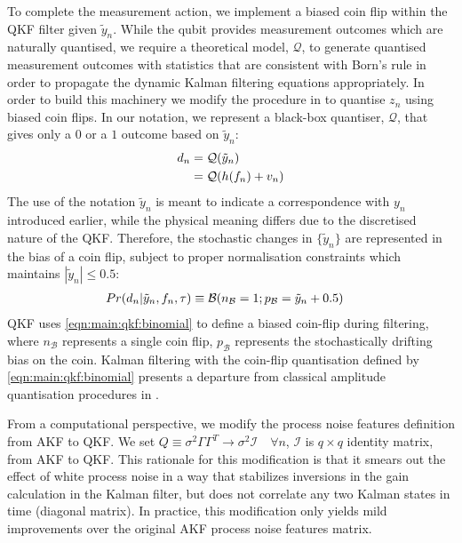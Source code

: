 To complete the measurement action, we implement a biased coin flip within the QKF filter given $\tilde{y}_n$.  While the qubit provides measurement outcomes which are naturally quantised, we require a theoretical model, $\mathcal{Q}$, to generate quantised measurement outcomes with statistics that are consistent with Born's rule in order to propagate the dynamic Kalman filtering equations appropriately. In order to build this machinery we modify the procedure in \cite{karlsson2005} to quantise $z_n$ using biased coin flips. In our notation, we represent a black-box quantiser, $\mathcal{Q}$, that gives only a $0$ or a $1$ outcome based on $\tilde{y}_n$:
\begin{align}
d_n &= \mathcal{Q}(\tilde{y}_n)\\
&=  \mathcal{Q}(h(f_n) + v_n)
\end{align}
The use of the notation $\tilde{y}_n$ is meant to indicate a correspondence with $y_{n}$ introduced earlier, while the physical meaning differs due to the discretised nature of the QKF.  Therefore, the stochastic changes in $\{ \tilde{y}_n\}$ are represented in the bias of a coin flip, subject to proper normalisation constraints which maintains $|\tilde{y}_n| \leq 0.5$:
\begin{align}
Pr(d_n| \tilde{y}_n, f_{n}, \tau) & \equiv \mathcal{B}(n_{\mathcal{B}}=1;p_{\mathcal{B}}= \tilde{y}_n + 0.5 ) \label{eqn:main:qkf:binomial}
\end{align}
QKF uses \cref{eqn:main:qkf:binomial} to define a biased coin-flip during filtering, where $n_{\mathcal{B}}$ represents a single coin flip, $p_{\mathcal{B}}$ represents the stochastically drifting bias on the coin. Kalman filtering with the coin-flip quantisation defined by \cref{eqn:main:qkf:binomial} presents a departure from classical amplitude quantisation procedures in \cite{widrow1996, karlsson2005}.

From a computational perspective, we modify the process noise features definition from AKF to QKF. We set $Q \equiv \sigma^2\Gamma \Gamma^T \to \sigma^2 \mathcal{I} \quad \forall n $, $\mathcal{I}$ is $q\times q$ identity matrix, from AKF to QKF. This rationale for this modification is that it smears out the effect of white process noise in a way that stabilizes inversions in the gain calculation in the Kalman filter, but does not correlate any two Kalman states in time (diagonal matrix). In practice, this modification only yields mild improvements over the original AKF process noise features matrix.

